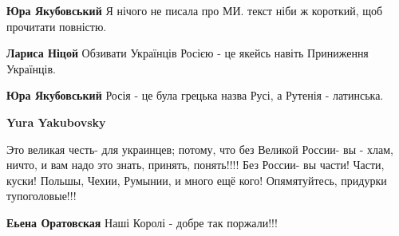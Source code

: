 \begin{itemize}
\begin{itemize}
 
\textbf{Юра Якубовський} Я нічого не писала про МИ. текст ніби ж короткий, щоб прочитати повністю.

\begin{itemize}
 
\textbf{Лариса Ніцой} Обзивати Українців Росією - це якейсь навіть Приниження Українців.

 
\textbf{Юра Якубовський} Росія - це була грецька назва Русі, а Рутенія - латинська.

 
\textbf{Yura Yakubovsky} 

Это великая честь- для украинцев; потому, что без Великой России- вы - хлам,
ничто, и вам надо это знать, принять, понять!!!! Без России- вы части! Части,
куски! Польшы, Чехии, Румынии, и много ещё кого! Опямятуйтесь, придурки
тупоголовые!!!


 
\textbf{Еьена Оратовская} Наші Королі - добре так поржали!!!


 

\end{itemize}
\end{itemize}
\end{itemize}
